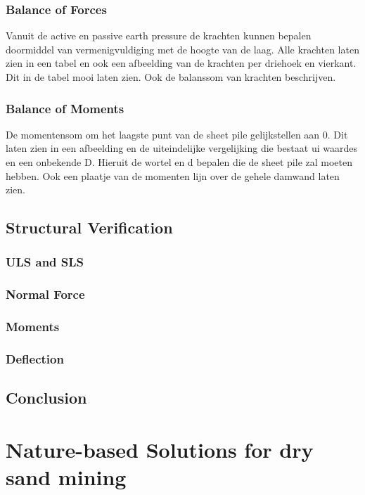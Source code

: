 \subsubsection{Balance of Forces}

Vanuit de active en passive earth pressure de krachten kunnen bepalen doormiddel van vermenigvuldiging met de hoogte van de laag. Alle krachten laten zien in een tabel en ook een afbeelding van de krachten per driehoek en vierkant. Dit in de tabel mooi laten zien. Ook de balanssom van krachten beschrijven.

\subsubsection{Balance of Moments}

De momentensom om het laagste punt van de sheet pile gelijkstellen aan 0. Dit laten zien in een afbeelding en de uiteindelijke vergelijking die bestaat ui waardes en een onbekende D. Hieruit de wortel en d bepalen die de sheet pile zal moeten hebben. Ook een plaatje van de momenten lijn over de gehele damwand laten zien.

\subsection{Structural Verification}

\subsubsection{ULS and SLS}

\subsubsection{Normal Force}

\subsubsection{Moments}

\subsubsection{Deflection}

\subsection{Conclusion}

\section{Nature-based Solutions for dry sand mining}